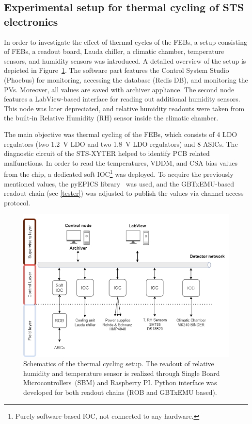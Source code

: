 
\subsection{Experimental setup for thermal cycling of STS electronics}
\label{cycling_setup}
In order to investigate the effect of thermal cycles of the FEBs, a setup consisting of FEBs, a readout board, Lauda chiller, a climatic chamber, temperature sensors, and humidity sensors was introduced.
A detailed overview of the setup is depicted in Figure~\ref{fig_setup}. The software part features the Control System Studio (Phoebus) for monitoring, accessing the database (Redis DB), and monitoring the \gls{PV}s. Moreover, all values are saved with archiver appliance. The second node features a LabView-based interface for reading out additional humidity sensors. This node was later depreciated, and relative humidity readouts were taken from the built-in Relative Humidity (\gls{RH}) sensor inside the climatic chamber.

The main objective was thermal cycling of the \glspl{FEB}, which consists of 4 LDO regulators (two \SI{1.2}{\volt} LDO and two \SI{1.8}{\volt} LDO regulators) and 8 \glspl{ASIC}. The diagnostic circuit of the STS-XYTER helped to identify \gls{PCB} related malfunctions. In order to read the temperatures, VDDM, and  \gls{CSA} bias values from the chip, a dedicated soft IOC\footnote{Purely software-based \gls{IOC}, not connected to any hardware.} was deployed. To acquire the previously mentioned values, the pyEPICS library~\cite{pyEPICS} was used, and the GBTxEMU-based readout chain (see \autoref{tester}) was adjusted to publish the values via channel access protocol. 
\begin{figure}[!h]
\centering
\includegraphics[width=0.75\columnwidth]{Chapter4/images/cycling_scheme.png}
\caption{Schematics of the thermal cycling setup. The readout of relative humidity and temperature sensor is realized through Single Board Microcontrollers~(\gls{SBM}) and Raspberry PI. Python interface was developed for both readout chains (ROB and GBTxEMU based). }
\label{fig_setup}
\end{figure}


